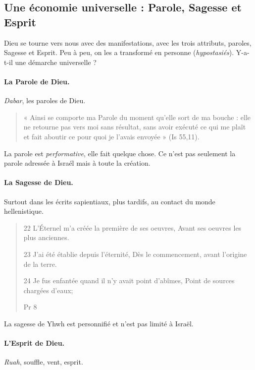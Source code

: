     \subsection{Une économie universelle : Parole, Sagesse et Esprit}
    
Dieu se tourne vers nous avec des manifestations, avec les trois attributs, paroles, Sagesse et Esprit. Peu à peu, on les a transformé en personne (\emph{hypostasiés}). Y-a-t-il une démarche universelle ?
  

     
      
      \paragraph{La Parole de Dieu.} \emph{Dabar}, les paroles de Dieu.
      
      \begin{quote}
          «  Ainsi  se  comporte  ma  Parole  du  moment  qu’elle  sort  de  ma  bouche  :  elle  ne  retourne  pas vers  moi  sans  résultat,  sans  avoir  exécuté  ce  qui  me  plaît  et  fait  aboutir  ce  pour  quoi  je  l’avais envoyée  »  (Is  55,11).   
      \end{quote}
      La parole est \textit{performative}, elle fait quelque chose. Ce n'est pas seulement la parole adressée à Israél mais à toute la création. 
     
      
      \paragraph{La Sagesse de Dieu.} Surtout dans les écrits sapientiaux, plus tardifs, au contact du monde hellenistique.
      \begin{quote}
      
  
22 L'Éternel m'a créée la première de ses oeuvres, Avant ses oeuvres les plus anciennes.

23 J'ai été établie depuis l'éternité, Dès le commencement, avant l'origine de la terre.

24 Je fus enfantée quand il n'y avait point d'abîmes, Point de sources chargées d'eaux;

          Pr 8
      \end{quote}
      La sagesse de Yhwh est personnifié et n'est pas limité à Israël.
     
      
      \paragraph{L'Esprit de Dieu.} \emph{Ruah}, souffle, vent, esprit.  
      
